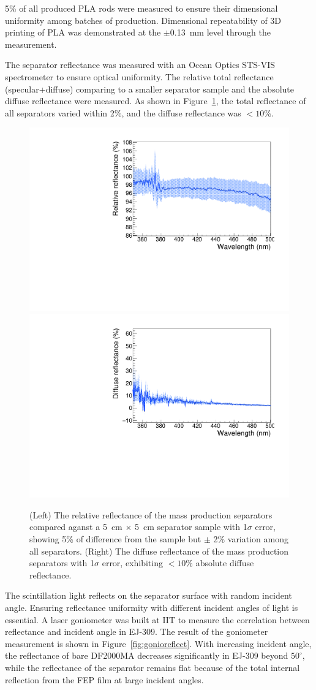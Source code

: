 5\% of all produced PLA rods were measured to ensure their dimensional uniformity among batches of production.
Dimensional repeatability of 3D printing of PLA was demonstrated at the $\pm$0.13~mm level through the measurement.

The separator reflectance was measured with an Ocean Optics STS-VIS spectrometer to ensure optical uniformity.
The relative total reflectance (specular+diffuse) comparing to a smaller separator sample and the absolute diffuse reflectance were measured.
As shown in Figure~\ref{fig:Reflector}, the total reflectance of all separators varied within 2\%, and the diffuse reflectance was $<10\%$.

\begin{figure}[h!]
\centering
\includegraphics[width=.45\textwidth]{Figures/Panel_Spec.pdf}\quad
\includegraphics[width=.45\textwidth]{Figures/Panel_Diff.pdf}
\caption[Separator reflectance measurement]{
(Left) The relative reflectance of the mass production separators compared aganst a 5~cm $\times$ 5~cm separator sample with 1$\sigma$ error, showing 5\% of difference from the sample but $\pm$ 2\% variation among all separators. 
(Right) The diffuse reflectance of the mass production separators with 1$\sigma$ error, exhibiting $<10\%$ absolute diffuse reflectance.}
\label{fig:Reflector}
\end{figure}

The scintillation light reflects on the separator surface with random incident angle.
Ensuring reflectance uniformity with different incident angles of light is essential.
A laser goniometer was built at IIT to measure the correlation between reflectance and incident angle in EJ-309.
The result of the goniometer measurement is shown in Figure~\ref{fig:gonioreflect}. 
With increasing incident angle, the reflectance of bare DF2000MA decreases significantly in EJ-309 beyond $50^\circ$, while the reflectance of the separator remains flat because of the total internal reflection from the FEP film at large incident angles.

